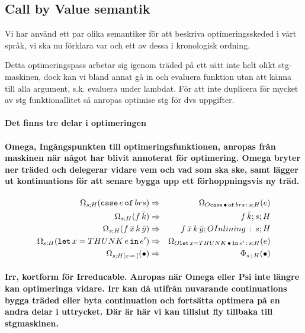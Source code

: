 \documentclass[../Optimise]{subfiles}
\begin{document}
\subsection{Call by Value semantik}
Vi har använd ett par olika semantiker för att beskriva optimeringsskeded
i vårt språk, vi ska nu förklara var och ett av dessa i kronologisk
ordning.


Detta optimeringspass arbetar sig igenom träded på ett sätt inte
helt olikt stg-maskinen, dock kan vi bland annat gå in och evaluera
funktion utan att känna till alla argument, s.k. evaluera under lambdat.
För att inte duplicera för mycket av stg funktionallitet så anropas
optimise stg för dvs uppgifter.


\paragraph{Det finns tre delar i optimeringen}


\paragraph{Omega, Ingångspunkten till optimeringsfunktionen, anropas från maskinen
när något har blivit annoterat för optimering. Omega bryter ner träded
och delegerar vidare vem och vad som ska ske, samt lägger ut kontinuations
för att senare bygga upp ett förhoppningsvis ny träd. }

\begin{align*}
\Omega_{s;H}(\mathtt{case}\,e\,\mathtt{of}\,brs) & \Rightarrow & \Omega_{O\mathtt{case}\,\bullet\,\mathtt{of}\,brs\,:\,s;H}(e)\\
\Omega_{s;H}(f\,\bar{k}) & \Rightarrow & f\,\bar{k};s;H\\
\Omega_{s;H}(f\,\bar{x}\, k\,\bar{y}) & \Rightarrow & f\,\bar{x}\, k\,\bar{y};OInlining\,:\,s;H\\
\Omega_{s;H}(\mathtt{let}\,x=THUNK\,e\,\mathtt{in}\,e') & \Rightarrow & \Omega_{O\mathtt{let\,}x=THUNK\,\bullet\,\mathtt{in}\,e'\,:\,s;H}(e)\\
\Omega_{s;H[x\nrightarrow\,]}(\bullet) & \Rightarrow & \Phi_{s\,;\,H}(\bullet)\end{align*}



\paragraph{Irr, kortform för Irreducable. Anropas när Omega eller Psi inte längre
kan optimeringa vidare. Irr kan då utifrån nuvarande continuations
bygga träded eller byta continuation och fortsätta optimera på en
andra delar i uttrycket. Där är här vi kan tillslut fly tillbaka till
stgmaskinen.}
\end{document}
